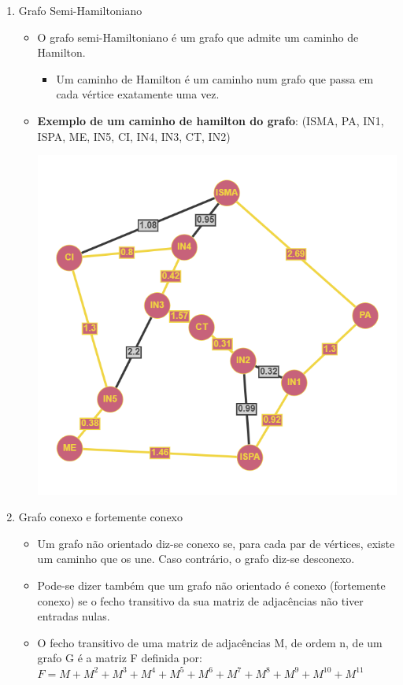 \documentclass[12pt]{article}
\begin{document}
\begin{enumerate}
    \item Grafo Semi-Hamiltoniano
        \begin{itemize}
              \item O grafo semi-Hamiltoniano é um grafo que admite um caminho de Hamilton.
              \begin{itemize}
              \item Um caminho de Hamilton é um caminho num grafo que passa em cada vértice
exatamente uma vez.

              \end{itemize}
            
                       

            \item \textbf{Exemplo de um caminho de hamilton do grafo}: (ISMA, PA, IN1, ISPA, ME, IN5, CI, IN4, IN3, CT, IN2)
            
            \centering\includegraphics[scale=0.4]{anexos/caminho_hamilton.png} 
            \end{itemize}
            
        \item Grafo conexo e fortemente conexo
            \begin{itemize}
              \item Um grafo não orientado diz-se conexo se, para cada par de vértices, existe um
                    caminho que os une. Caso contrário, o grafo diz-se desconexo.
               \item Pode-se dizer também que um grafo não orientado é conexo (fortemente conexo) se o fecho transitivo da sua matriz de adjacências não tiver entradas nulas.
               \item O fecho transitivo de uma matriz de adjacências M, de ordem n, de um grafo G é a matriz F definida por: \newline\break $ F = M + M^{2} + M^{3} + M^{4} + M^{5} + M^{6} + M^{7} + M^{8} + M^{9} + M^{10} + M^{11} $ 
            

\end{itemize}
\end{enumerate}
\end{document}
